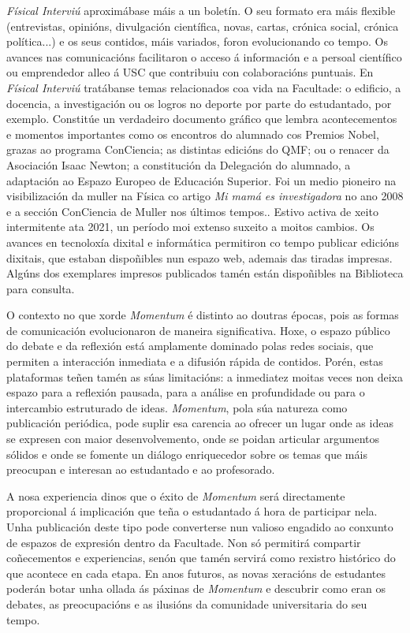 \begin{multicols}{2}
\textit{Físical Interviú} aproximábase máis a un boletín. O seu formato era
máis flexible (entrevistas, opinións, divulgación científica, novas, cartas,
crónica social, crónica política...) e os seus contidos, máis variados, foron
evolucionando co tempo. Os avances nas comunicacións facilitaron o acceso á
información e a persoal científico ou emprendedor alleo á USC que contribuiu
con colaboracións puntuais. En \textit{Físical Interviú} tratábanse temas
relacionados coa vida na Facultade: o edificio, a docencia, a investigación ou
os logros no deporte por parte do estudantado, por exemplo. Constitúe un
verdadeiro documento gráfico que lembra acontecementos e momentos  importantes
como os encontros do alumnado cos Premios Nobel, grazas ao programa ConCiencia;
as distintas edicións do QMF; ou o renacer da Asociación Isaac Newton; a
constitución da Delegación do alumnado, a adaptación ao Espazo Europeo de
Educación Superior. Foi un medio pioneiro na visibilización da muller na Física
co artigo \textit{Mi mamá es investigadora} no ano 2008 e a sección ConCiencia
de Muller nos últimos tempos.. Estivo activa de xeito intermitente ata 2021, un
período moi extenso suxeito a moitos cambios. Os avances en tecnoloxía dixital
e informática permitiron co tempo publicar edicións dixitais, que estaban
dispoñibles nun espazo web, ademais das tiradas impresas. Algúns dos exemplares
impresos  publicados tamén están dispoñibles na Biblioteca para consulta.

O contexto no que xorde \textit{Momentum} é distinto ao doutras épocas, pois as
formas de comunicación evolucionaron de maneira significativa. Hoxe, o espazo
público do debate e da reflexión está amplamente dominado polas redes sociais,
que permiten a interacción inmediata e a difusión rápida de contidos. Porén,
estas plataformas teñen tamén as súas limitacións: a inmediatez moitas veces
non deixa espazo para a reflexión pausada, para a análise en profundidade ou
para o intercambio estruturado de ideas. \textit{Momentum}, pola súa natureza
como publicación periódica, pode suplir esa carencia ao ofrecer un lugar onde
as ideas se expresen con maior desenvolvemento, onde se poidan articular
argumentos sólidos e onde se fomente un diálogo enriquecedor sobre os temas que
máis preocupan e interesan ao estudantado e ao profesorado.

A nosa experiencia dinos que o éxito de \textit{Momentum} será directamente
proporcional á implicación que teña o estudantado á hora de participar nela.
Unha publicación deste tipo pode converterse nun valioso engadido ao conxunto
de espazos de expresión dentro da Facultade. Non só permitirá compartir
coñecementos e experiencias, senón que tamén servirá como rexistro histórico do
que acontece en cada etapa. En anos futuros, as novas xeracións de estudantes
poderán botar unha ollada ás páxinas de \textit{Momentum} e descubrir como eran
os debates, as preocupacións e as ilusións da comunidade universitaria do seu
tempo.


\end{multicols}
